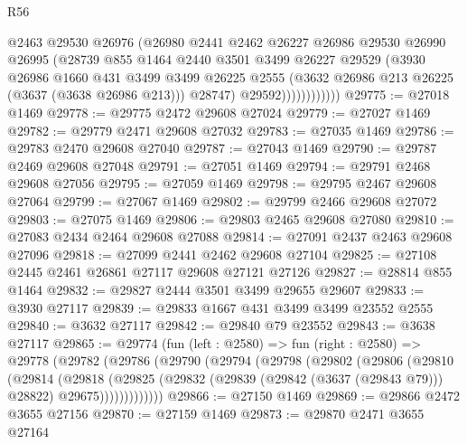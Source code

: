 \begin{lexlean}{R56}
\begin{coremodule}
                        @2463
                        @29530
                        @26976
                        (@26980
                          @2441
                          @2462
                          @26227
                          @26986
                          @29530
                          @26990
                          @26995
                          (@28739
                            @855
                            @1464
                            @2440
                            @3501
                            @3499
                            @26227
                            @29529
                            (@3930
                              @26986
                              @1660
                              @431
                              @3499
                              @3499
                              @26225
                              @2555
                              (@3632 @26986 @213 @26225 (@3637 (@3638 @26986 @213)))
                              @28747)
                            @29592))))))))))))
@29775 := @27018 @1469
@29778 := @29775 @2472 @29608 @27024
@29779 := @27027 @1469
@29782 := @29779 @2471 @29608 @27032
@29783 := @27035 @1469
@29786 := @29783 @2470 @29608 @27040
@29787 := @27043 @1469
@29790 := @29787 @2469 @29608 @27048
@29791 := @27051 @1469
@29794 := @29791 @2468 @29608 @27056
@29795 := @27059 @1469
@29798 := @29795 @2467 @29608 @27064
@29799 := @27067 @1469
@29802 := @29799 @2466 @29608 @27072
@29803 := @27075 @1469
@29806 := @29803 @2465 @29608 @27080
@29810 := @27083 @2434 @2464 @29608 @27088
@29814 := @27091 @2437 @2463 @29608 @27096
@29818 := @27099 @2441 @2462 @29608 @27104
@29825 := @27108 @2445 @2461 @26861 @27117 @29608 @27121 @27126
@29827 := @28814 @855 @1464
@29832 := @29827 @2444 @3501 @3499 @29655 @29607
@29833 := @3930 @27117
@29839 := @29833 @1667 @431 @3499 @3499 @23552 @2555
@29840 := @3632 @27117
@29842 := @29840 @79 @23552
@29843 := @3638 @27117
@29865 := @29774
    (fun (left : @2580) =>
    fun (right : @2580) =>
    @29778
      (@29782
        (@29786
          (@29790
            (@29794
              (@29798
                (@29802
                  (@29806
                    (@29810
                      (@29814
                        (@29818
                          (@29825
                            (@29832
                              (@29839 (@29842 (@3637 (@29843 @79))) @28822)
                              @29675)))))))))))))
@29866 := @27150 @1469
@29869 := @29866 @2472 @3655 @27156
@29870 := @27159 @1469
@29873 := @29870 @2471 @3655 @27164

\end{coremodule}
\end{lexlean}
